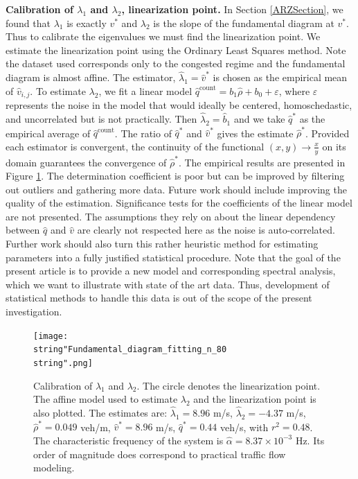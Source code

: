 \documentclass[preprint]{elsarticle}
\DeclareMathOperator{\cnt}{count}
\begin{document}
\textbf{Calibration of $\lambda_{1}$ and $\lambda_{2}$, linearization point.} In Section \ref{ARZSection}, we found that $\lambda_{1}$ is exactly $v^*$ and $\lambda_{2}$ is the slope of the fundamental diagram at $v^*$. Thus to calibrate the eigenvalues we must find the linearization point. We estimate the linearization point using the Ordinary Least Squares method. Note the dataset used corresponds only to the congested regime and the fundamental diagram is almost affine. The estimator, $\widehat{\lambda}_1=\widehat{v}^*$ is chosen as the empirical mean of $\widehat{v}_{i,j}$. To estimate $\lambda_{2}$, we fit a linear model $\widehat{q}^{\text{count}}=b_{1}\widehat{\rho}+b_{0}+\varepsilon$, where $\varepsilon$
represents the noise in the model that would ideally be centered,
homoschedastic, and uncorrelated but is not practically. Then $\widehat{\lambda}_{2}=\widehat{b}_{1}$ and we take $\widehat{q}^*$ as the empirical average of $\widehat{q}^{\cnt}$. The ratio of $\widehat{q}^*$ and $\widehat{v}^*$ gives the estimate $\widehat{\rho}^*$.
Provided each estimator is convergent, the continuity of the functional
$\left(x,y\right)\rightarrow\frac{x}{y}$ on its domain guarantees the convergence of $\widehat{\rho}^*$. The empirical results are presented in Figure \ref{fig:Calibration-of-eigen-values}. The determination coefficient is poor but can be improved by filtering out outliers and gathering more data. Future work should include improving the quality of the estimation. Significance tests for the coefficients of the linear model are not presented. The assumptions they rely on about
the linear dependency between $\widehat{q}$ and $\widehat{v}$ are clearly
not respected here as the noise is auto-correlated. Further work should also turn this rather heuristic method for estimating parameters
into a fully justified statistical procedure. Note that the goal of the present article is to provide a new model and corresponding spectral analysis, which we want to illustrate with state of the art data. Thus, development of statistical methods to handle this data is out of the scope of the present investigation.

\begin{figure}[H]
\centering
\texttt{[image: \\string"Fundamental\_diagram\_fitting\_n\_80\\string".png]}
\protect\caption{Calibration of $\lambda_{1}$ and $\lambda_{2}$. The circle denotes the linearization point. The affine model used to estimate $\lambda_{2}$ and the linearization point is also plotted. The estimates are: $\widehat{\lambda}_{1}=8.96$ m/s, $\widehat{\lambda}_{2}=-4.37$ m/s, $\widehat{\rho}^{*}=0.049$ veh/m, $\widehat{v}^{*}=8.96$ m/s, $\widehat{q}^{*}=0.44$ veh/s, with $r^{2}=0.48$. The characteristic frequency of the system is $\widehat{\alpha} = 8.37\times10^{-3}$ Hz. Its order of magnitude does correspond to practical traffic flow modeling.}
\label{fig:Calibration-of-eigen-values}
\end{figure}
\end{document}
